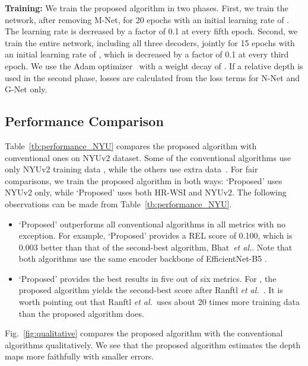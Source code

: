 \documentclass[runningheads]{llncs}
\newcommand{\etal}{\textit{et al.}}
\begin{document}
{\noindent \bf Training:} We train the proposed algorithm in two phases. First, we train the network, after removing M-Net, for 20 epochs with an initial learning rate of . The learning rate is decreased by a factor of 0.1 at every fifth epoch. Second, we train the entire network, including all three decoders, jointly for 15 epochs with an initial learning rate of , which is decreased by a factor of 0.1 at every third epoch. We use the Adam optimizer~\cite{kingma2014adam} with a weight decay of . If a relative depth is used in the second phase, losses are calculated from the loss terms for N-Net and G-Net only.

\subsection{Performance Comparison}
Table~\ref{tb:performance_NYU} compares the proposed algorithm with conventional ones on NYUv2 dataset. Some of the conventional algorithms use only NYUv2 training data \cite{eigen2014depth,laina2016deeper,hao2018detail,fu2018deep,hu2018squeeze,chen2019structure,yin2019enforcing,lee2019big,huynh2020guiding,lee2020multi,bhat2021adabins}, while the others use extra data~\cite{wang2015towards,ranftl2021vision,ramamonjisoa2019sharpnet}. For fair comparisons, we train the proposed algorithm in both ways: `Proposed' uses NYUv2 only, while `Proposed' uses both HR-WSI and NYUv2. The following observations can be made from Table~\ref{tb:performance_NYU}.
\begin{itemize}
\itemsep0mm
\item `Proposed' outperforms all conventional algorithms in all metrics with no exception.
For example, `Proposed' provides a REL score of 0.100, which is 0.003 better than that of the second-best algorithm, Bhat~\etal \cite{bhat2021adabins}. Note that both algorithms use the same encoder backbone of EfficientNet-B5 \cite{tan2019efficientnet}.
\item `Proposed' provides the best results in five out of six metrics. For , the proposed algorithm yields the second-best score after Ranftl \etal\ \cite{ranftl2021vision}. It is worth pointing out that Ranftl \etal\ uses about 20 times more training data than the proposed algorithm does.
\end{itemize}
Fig.~\ref{fig:qualitative} compares the proposed algorithm with the conventional algorithms \cite{eigen2014depth, fu2018deep, chen2019structure, lee2019big, bhat2021adabins, ranftl2021vision} qualitatively. We see that the proposed algorithm estimates the depth maps more faithfully with smaller errors.
\end{document}
